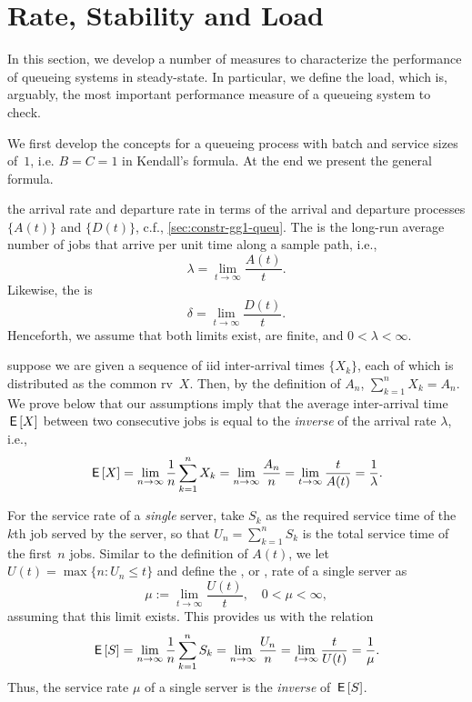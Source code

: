 \documentclass[queueing-book.tex]{subfiles}
\begin{document}
\section{Rate, Stability and Load}
\label{sec:rate-stability}



In this section, we develop a number of measures to characterize the performance of queueing systems in steady-state.
In particular, we define the load, which is, arguably, the most important performance measure of a queueing system to check.

We first develop the concepts for a queueing process with batch and service sizes of~$1$, i.e. $B=C=1$ in Kendall's formula. At the end we present the general formula.


 the arrival rate and departure rate in terms of the arrival and departure processes $\{A(t)\}$ and $\{D(t)\}$, c.f., \cref{sec:constr-gg1-queu}.
The  is the long-run average number of jobs that arrive per unit time along a sample path, i.e.,
\begin{equation*}
 \lambda = \lim_{t\to\infty} \frac{A(t)}t.
\end{equation*}
Likewise, the  is
\begin{equation}\label{eq:28}
 \delta = \lim_{t\to\infty} \frac{D(t)}t.
\end{equation}
Henceforth, we assume that both limits exist, are finite, and $0<\lambda<\infty$.


 suppose we are given a sequence of iid inter-arrival times $\{X_k\}$, each of which is distributed as the common rv~$X$.
Then, by the definition of $A_{n}$, $\sum_{k=1}^n X_k = A_n$.
We prove below that our assumptions imply that the average inter-arrival time $\,\mathsf{E}\left[X\right]$ between two consecutive jobs is equal to the \emph{inverse} of the arrival rate $\lambda$, i.e.,
\begin{equation*}
 \,\mathsf{E}\left[X\right] = \lim_{n\to\infty} \frac{1}n\sum_{k=1}^n X_k = \lim_{n\to\infty} \frac{A_{n}}{n} = \lim_{t\to\infty} \frac t{A(t)} = \frac 1 \lambda.
\end{equation*}

For the service rate of a \emph{single} server, take $S_k$ as the required service time of the~$k$th job served by the server, so that $U_n = \sum_{k=1}^n S_k$ is the total service time of the first~$n$ jobs.
Similar to the definition of $A(t)$, we let $ U(t) = \max\{n: U_n \leq t\}$ and define the , or , rate of a single server as
\begin{equation*}
 \mu := \lim_{t\to\infty} \frac{U(t)}t, \quad 0 < \mu < \infty,
\end{equation*}
assuming that this limit exists. This provides us with the relation
\begin{equation*}
 \,\mathsf{E}\left[S\right] = \lim_{n\to\infty} \frac 1 n \sum_{k=1}^n S_k = \lim_{n\to\infty} \frac{U_n}{n} = \lim_{t\to\infty} \frac t{U(t)} = \frac 1 \mu.
\end{equation*}
Thus, the service rate $\mu$ of a single server is the \emph{inverse} of $\,\mathsf{E}\left[S\right]$.
\end{document}
